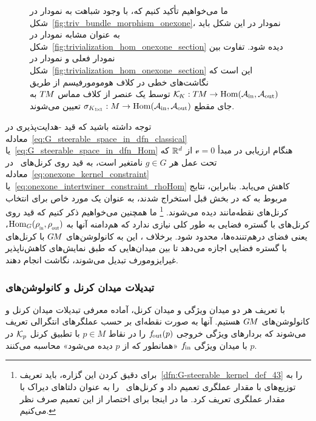 \begin{figure}
{        ما می‌خواهیم تأکید کنیم که، با وجود شباهت به نمودار در شکل~\ref{fig:triv_bundle_morphism_onexone}، نمودار در این شکل باید به عنوان مشابه نمودار در شکل~\ref{fig:trivialization_hom_onexone_section} دیده شود.
        تفاوت بین نمودار فعلی و نمودار در شکل~\ref{fig:trivialization_hom_onexone_section} این است که نگاشت‌های خطی در کلاف هومومورفیسم از طریق $\mathcal{K}_{\mkern-2mu K}: T\mkern-1.5muM\to \operatorname{Hom}(\mathcal{A}_\textup{in},\mathcal{A}_\textup{out})$ توسط یک عنصر از کلاف مماس $T\mkern-1.5muM$ به جای مقطع $\sigma_{K_{1\!\times\!1}}: M\to \operatorname{Hom}(\mathcal{A}_\textup{in},\mathcal{A}_\textup{out})$ تعیین می‌شوند.
    }
    \label{fig:triv_kernel_bundle_morphism}
\end{figure}


توجه داشته باشید که قید -هدایت‌پذیری در معادله~\eqref{eq:G_steerable_space_in_dfn_classical} یا~\eqref{eq:G_steerable_space_in_dfn_Hom} هنگام ارزیابی در مبدأ $\mathscr{v}=0$ از $\mathbb{R}^d$ که تحت عمل هر $g\in G$ نامتغیر است، به قید روی کرنل‌های \onexoneGM\ در معادله~\eqref{eq:onexone_kernel_constraint} یا~\eqref{eq:onexone_intertwiner_constraint_rhoHom} کاهش می‌یابد.
بنابراین، نتایج مربوط به \onexoneGMs که در بخش قبل استخراج شدند، به عنوان یک مورد خاص برای انتخاب کرنل‌های نقطه‌مانند دیده می‌شوند.%
\footnote{
    برای دقیق کردن این گزاره، باید تعریف~\ref{dfn:G-steerable_kernel_def_43} را به توزیع‌های با مقدار عملگری تعمیم داد و کرنل‌های \onexoneGM\ را به عنوان دلتاهای دیراک با مقدار عملگری تعریف کرد.
    ما در اینجا برای اختصار از این تعمیم صرف نظر می‌کنیم.
}
ما همچنین می‌خواهیم ذکر کنیم که قید روی کرنل‌های با گستره فضایی به طور کلی نیازی ندارد که هم‌دامنه آنها به $\Hom_G(\rhoin,\rhoout)$، یعنی فضای درهم‌تننده‌ها، محدود شود.
برخلاف \onexoneGMs، این به کانولوشن‌های $G\mkern-1.4muM$ با کرنل‌های با گستره فضایی اجازه می‌دهد تا بین میدان‌هایی که طبق نمایش‌های کاهش‌ناپذیر غیرایزومورف تبدیل می‌شوند، نگاشت انجام دهند.










\subsubsection{تبدیلات میدان کرنل و کانولوشن‌های }
\label{sec:KFTs_GM-conv_global}

با تعریف هر دو میدان ویژگی و میدان کرنل، آماده معرفی تبدیلات میدان کرنل و کانولوشن‌های $G\mkern-1.4muM$ هستیم.
آنها به صورت نقطه‌ای بر حسب عملگرهای انتگرالی تعریف می‌شوند که بردارهای ویژگی خروجی $f_\textup{\:\!\!out}(p)$ را در نقاط $p\in M$ با تطبیق کرنل $\mathcal{K}_p$ در $p$ با میدان ویژگی $f_\textup{\;\!\!in}$ «همانطور که از $p$ دیده می‌شود» محاسبه می‌کنند.

